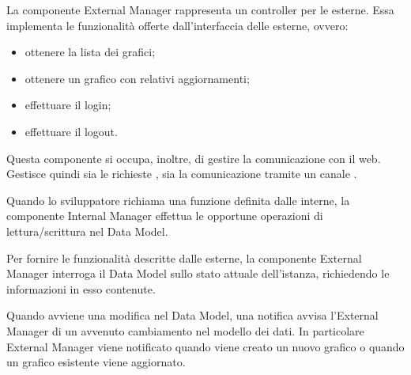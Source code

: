 			La componente External  Manager rappresenta un controller per le  esterne. Essa implementa le funzionalità offerte dall'interfaccia delle  esterne, ovvero:
			\begin{itemize}
				\item ottenere la lista dei grafici;
				\item ottenere un grafico con relativi aggiornamenti;
				\item effettuare il login;
				\item effettuare il logout.
			\end{itemize}
		Questa componente si occupa, inoltre, di gestire la comunicazione con il  web. Gestisce quindi sia le richieste , sia la comunicazione tramite un canale .


			Quando lo sviluppatore richiama una funzione definita dalle  interne, la componente Internal  Manager effettua le opportune operazioni di lettura/scrittura nel Data Model.

			Per fornire le funzionalità descritte dalle  esterne, la componente External  Manager interroga il Data Model sullo stato attuale dell'istanza, richiedendo le informazioni in esso contenute.

			Quando avviene una modifica nel Data Model, una notifica avvisa l'External  Manager di un avvenuto cambiamento nel modello dei dati. In particolare External  Manager viene notificato quando viene creato un nuovo grafico o quando un grafico esistente viene aggiornato.

